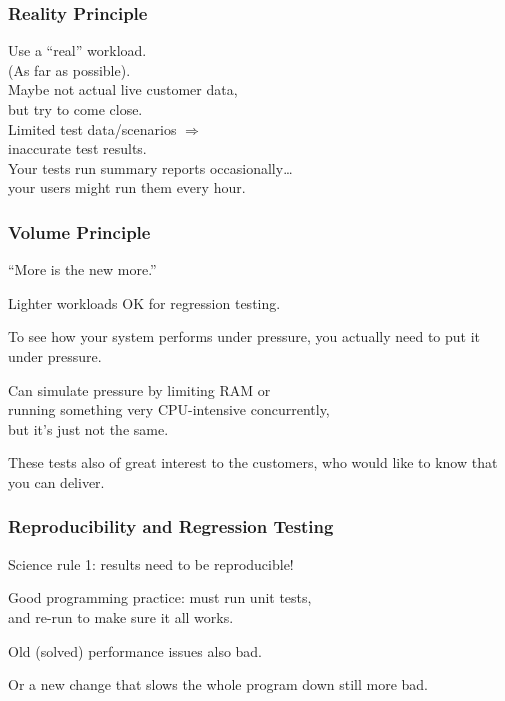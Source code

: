 \begin{frame}
\frametitle{Reality Principle}

\begin{changemargin}{2cm}
Use a ``real'' workload.\\
(As far as possible).\\[1em]
Maybe not actual live customer data,\\
but try to come close.\\[1em]
Limited test data/scenarios $\Rightarrow$ \\
\qquad inaccurate test results.\\[1em]
Your tests run summary reports occasionally\ldots\\
your users might run them every hour. 
\end{changemargin}
\end{frame}



\begin{frame}
\frametitle{Volume Principle}

\begin{changemargin}{2cm}
``More is the new more.'' 

Lighter workloads OK for regression testing. 

To see how your system performs under pressure, you actually need to put it under pressure. 

Can simulate pressure by limiting RAM or\\ running something very CPU-intensive concurrently,\\
but it's just not the same.

These tests also  of great interest to the customers, who would like to know that you can deliver. 
\end{changemargin}

\end{frame}



\begin{frame}
\frametitle{Reproducibility and Regression Testing}


\begin{changemargin}{2cm}
Science rule 1: results need to be reproducible!

Good programming practice: must run unit tests,\\
and re-run to make sure it all works. 

Old (solved) performance issues also bad.

Or a new change that slows the whole program down still more bad.
\end{changemargin}
\end{frame}



